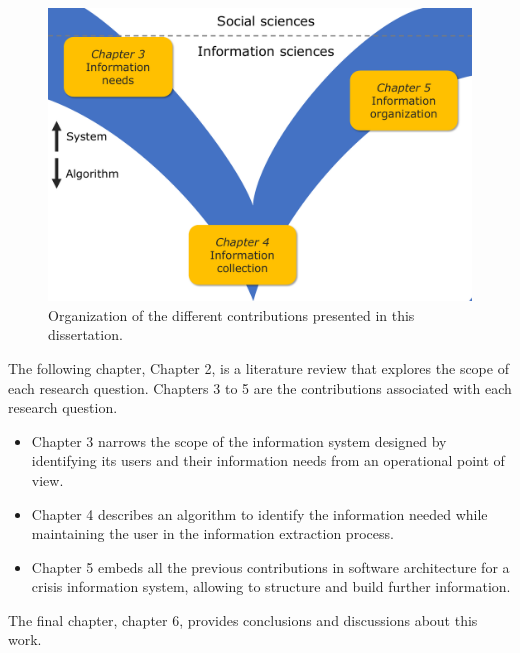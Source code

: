\begin{figure}[htb]
    \includegraphics[width=\textwidth]{figures/chap-1/dissertation-plan.pdf}
    \caption{Organization of the different contributions presented in this dissertation.}
    \label{context:plan}
\end{figure}

The following chapter, Chapter 2, is a literature review that explores the scope of each research question.
Chapters 3 to 5 are the contributions associated with each research question.

\begin{itemize}
    \item Chapter 3 narrows the scope of the information system designed by identifying its users and their information needs from an operational point of view.
    \item Chapter 4 describes an algorithm to identify the information needed while maintaining the user in the information extraction process.
    \item Chapter 5 embeds all the previous contributions in software architecture for a crisis information system, allowing to structure and build further information.
\end{itemize}

The final chapter, chapter 6, provides conclusions and discussions about this work.

